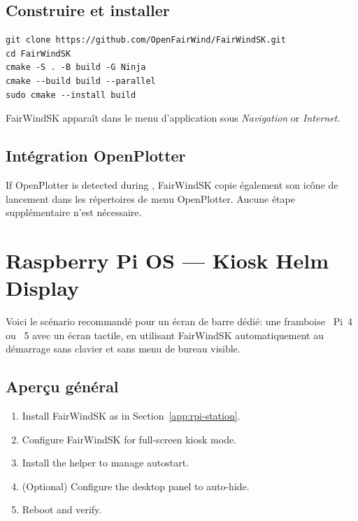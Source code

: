 \subsection{Construire et installer}

\begin{lstlisting}
git clone https://github.com/OpenFairWind/FairWindSK.git
cd FairWindSK
cmake -S . -B build -G Ninja
cmake --build build --parallel
sudo cmake --install build
\end{lstlisting}

FairWindSK apparaît dans le menu d'application sous
\textit{Navigation} or \textit{Internet}.

\subsection{Intégration OpenPlotter}

If OpenPlotter is detected during , FairWindSK
copie également son icône de lancement dans les répertoires de menu OpenPlotter.
Aucune étape supplémentaire n'est nécessaire.

\section{Raspberry Pi OS --- Kiosk Helm Display}
\label{app:rpi-kiosk}

Voici le scénario recommandé pour un écran de barre dédié:
une framboise ~Pi~4 ou ~5 avec un écran tactile, en utilisant FairWindSK automatiquement
au démarrage sans clavier et sans menu de bureau visible.

\subsection{Aperçu général}

\begin{enumerate}
  \item Install FairWindSK as in Section~\ref{app:rpi-station}.
  \item Configure FairWindSK for full-screen kiosk mode.
  \item Install the  helper to manage autostart.
  \item (Optional) Configure the desktop panel to auto-hide.
  \item Reboot and verify.
\end{enumerate}

